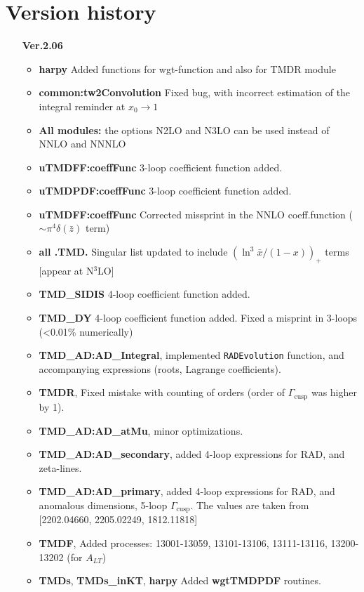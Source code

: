 \documentclass[prd,nofootinbib,eqsecnum,final]{revtex4}
\renewcommand{\(}{\left(}
\renewcommand{\)}{\right)}
\renewcommand{\[}{\left[}
\renewcommand{\]}{\right]}
\begin{document}
\section{Version history}
\begin{itemize}
\item[\textbf{Ver.2.06}]
\begin{itemize}
	\item \textbf{harpy} Added functions for wgt-function and also for TMDR module
	\item \textbf{common:tw2Convolution} Fixed bug, with incorrect estimation of the integral reminder at $x_0\to 1$
	\item \textbf{All modules:} the options N2LO and N3LO can be used instead of NNLO and NNNLO
	\item \textbf{uTMDFF:coeffFunc} 3-loop coefficient function added. 
	\item \textbf{uTMDPDF:coeffFunc} 3-loop coefficient function added.
	\item \textbf{uTMDFF:coeffFunc} Corrected missprint in the NNLO coeff.function ($\sim\pi^4\delta(\bar z)$ term)  
	\item \textbf{all .TMD.} Singular list updated to include $(\ln^3\bar x/(1-x))_+$ terms [appear at N$^3$LO]
	\item \textbf{TMD\_SIDIS} 4-loop coefficient function added. 
	\item \textbf{TMD\_DY} 4-loop coefficient function added. Fixed a misprint in 3-loops (<0.01\% numerically)
	\item \textbf{TMD\_AD:AD\_Integral}, implemented \texttt{RADEvolution} function, and accompanying expressions (roots, Lagrange coefficients).
	\item \textbf{TMDR}, Fixed mistake with counting of orders (order of $\Gamma_{\text{cusp}}$ was higher by 1).
	\item \textbf{TMD\_AD:AD\_atMu}, minor optimizations.
	\item \textbf{TMD\_AD:AD\_secondary}, added 4-loop expressions for RAD, and zeta-lines.
	\item \textbf{TMD\_AD:AD\_primary}, added 4-loop expressions for RAD, and anomalous dimensions, 5-loop $\Gamma_{\text{cusp}}$. The values are taken from [2202.04660, 2205.02249, 1812.11818]
	\item \textbf{TMDF}, Added processes: 13001-13059, 13101-13106, 13111-13116, 13200-13202 (for $A_{LT}$)
	\item \textbf{TMDs}, \textbf{TMDs\_inKT}, \textbf{harpy} Added \textbf{wgtTMDPDF} routines.

\end{itemize}
\end{itemize}
\end{document}
